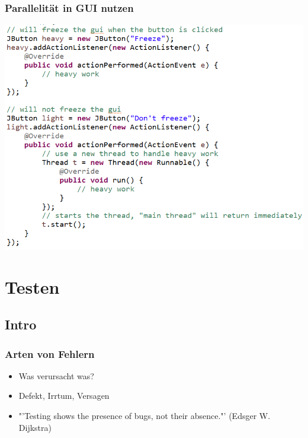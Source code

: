 \documentclass[18pt]{beamer}
\begin{document}
	\begin{frame}
		\frametitle{Parallelität in GUI nutzen}
		\centering
		\includegraphics[scale=0.4]{./pics/tut5/extra-thread.png}

	\end{frame}

\section{Testen}
	\subsection{Intro}
	
	\begin{frame}
		\frametitle{Arten von Fehlern}
		\begin{itemize}
			\item Was verursacht was?
			\item Defekt, Irrtum, Versagen \pause
			\item "'Testing shows the presence of bugs, not their absence."' (Edsger W. Dijkstra)
		\end{itemize}
	\end{frame}
\end{document}
